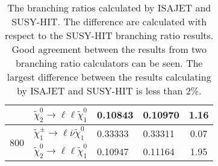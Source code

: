 \begin{table}[htb]
\begin{center}
{\begin{tabular}{clllc}
                                     & $\widetilde{\chi}^{0}_{2} \rightarrow \ell \ell \widetilde{\chi}^{0}_{1}$        & 0.10843         & 0.10970           & 1.16\\
                \hline
                \multirow{2}{*}{800} & $\widetilde{\chi}^{\pm}_{1} \rightarrow \ell \bar{\nu} \widetilde{\chi}^{0}_{1}$ & 0.33333         & 0.33311           & 0.07\\
                                     & $\widetilde{\chi}^{0}_{2} \rightarrow \ell \ell \widetilde{\chi}^{0}_{1}$        & 0.10947         & 0.11164           & 1.95\\
                \hline
                \hline
            \end{tabular}
        }
    \end{center}
    \caption{The branching ratios calculated by \textsc{ISAJET} and SUSY-HIT.
    The difference are calculated with respect to the SUSY-HIT branching ratio results.
    Good agreement between the results from two branching ratio calculators can be seen.
    The largest difference between the results calculating by \textsc{ISAJET} and SUSY-HIT is less than 2\%. 
    }
    \label{tab:data_susy_hit}
\end{table}%

